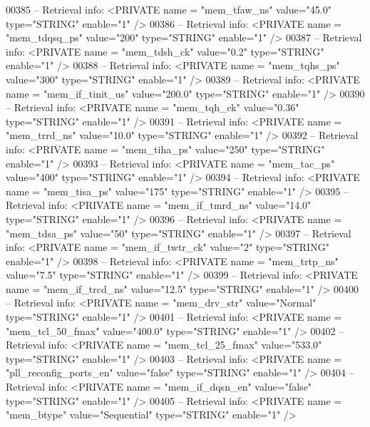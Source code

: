 \begin{DoxyCode}
{00385 \textcolor{keyword}{-- Retrieval info:      <PRIVATE name = "mem\_tfaw\_ns" value="45.0"  type="STRING"  enable="1" />}
00386 \textcolor{keyword}{-- Retrieval info:      <PRIVATE name = "mem\_tdqsq\_ps" value="200"  type="STRING"  enable="1" />}
00387 \textcolor{keyword}{-- Retrieval info:      <PRIVATE name = "mem\_tdsh\_ck" value="0.2"  type="STRING"  enable="1" />}
00388 \textcolor{keyword}{-- Retrieval info:      <PRIVATE name = "mem\_tqhs\_ps" value="300"  type="STRING"  enable="1" />}
00389 \textcolor{keyword}{-- Retrieval info:      <PRIVATE name = "mem\_if\_tinit\_us" value="200.0"  type="STRING"  enable="1" />}
00390 \textcolor{keyword}{-- Retrieval info:      <PRIVATE name = "mem\_tqh\_ck" value="0.36"  type="STRING"  enable="1" />}
00391 \textcolor{keyword}{-- Retrieval info:      <PRIVATE name = "mem\_trrd\_ns" value="10.0"  type="STRING"  enable="1" />}
00392 \textcolor{keyword}{-- Retrieval info:      <PRIVATE name = "mem\_tiha\_ps" value="250"  type="STRING"  enable="1" />}
00393 \textcolor{keyword}{-- Retrieval info:      <PRIVATE name = "mem\_tac\_ps" value="400"  type="STRING"  enable="1" />}
00394 \textcolor{keyword}{-- Retrieval info:      <PRIVATE name = "mem\_tisa\_ps" value="175"  type="STRING"  enable="1" />}
00395 \textcolor{keyword}{-- Retrieval info:      <PRIVATE name = "mem\_if\_tmrd\_ns" value="14.0"  type="STRING"  enable="1" />}
00396 \textcolor{keyword}{-- Retrieval info:      <PRIVATE name = "mem\_tdsa\_ps" value="50"  type="STRING"  enable="1" />}
00397 \textcolor{keyword}{-- Retrieval info:      <PRIVATE name = "mem\_if\_twtr\_ck" value="2"  type="STRING"  enable="1" />}
00398 \textcolor{keyword}{-- Retrieval info:      <PRIVATE name = "mem\_trtp\_ns" value="7.5"  type="STRING"  enable="1" />}
00399 \textcolor{keyword}{-- Retrieval info:      <PRIVATE name = "mem\_if\_trcd\_ns" value="12.5"  type="STRING"  enable="1" />}
00400 \textcolor{keyword}{-- Retrieval info:      <PRIVATE name = "mem\_drv\_str" value="Normal"  type="STRING"  enable="1" />}
00401 \textcolor{keyword}{-- Retrieval info:      <PRIVATE name = "mem\_tcl\_50\_fmax" value="400.0"  type="STRING"  enable="1" />}
00402 \textcolor{keyword}{-- Retrieval info:      <PRIVATE name = "mem\_tcl\_25\_fmax" value="533.0"  type="STRING"  enable="1" />}
00403 \textcolor{keyword}{-- Retrieval info:      <PRIVATE name = "pll\_reconfig\_ports\_en" value="false"  type="STRING"  enable="1" />}
00404 \textcolor{keyword}{-- Retrieval info:      <PRIVATE name = "mem\_if\_dqsn\_en" value="false"  type="STRING"  enable="1" />}
00405 \textcolor{keyword}{-- Retrieval info:      <PRIVATE name = "mem\_btype" value="Sequential"  type="STRING"  enable="1" />}
}
\end{DoxyCode}
